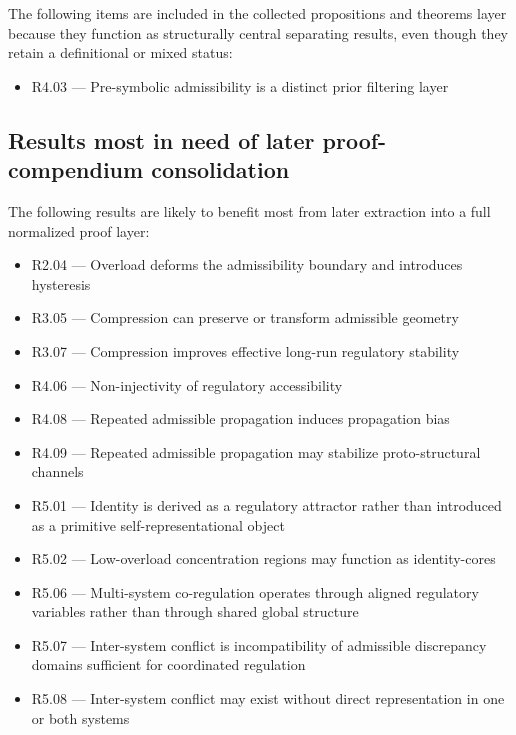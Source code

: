 \documentclass[12pt]{article}
\begin{document}
	The following items are included in the collected propositions and theorems layer because they
	function as structurally central separating results, even though they retain a definitional or
	mixed status:
	
	\begin{itemize}[leftmargin=2em]
		\item R4.03 --- Pre-symbolic admissibility is a distinct prior filtering layer
	\end{itemize}
	
	\subsection{Results most in need of later proof-compendium consolidation}
	
	The following results are likely to benefit most from later extraction into a full normalized
	proof layer:
	
	\begin{itemize}[leftmargin=2em]
		\item R2.04 --- Overload deforms the admissibility boundary and introduces hysteresis
		\item R3.05 --- Compression can preserve or transform admissible geometry
		\item R3.07 --- Compression improves effective long-run regulatory stability
		\item R4.06 --- Non-injectivity of regulatory accessibility
		\item R4.08 --- Repeated admissible propagation induces propagation bias
		\item R4.09 --- Repeated admissible propagation may stabilize proto-structural channels
		\item R5.01 --- Identity is derived as a regulatory attractor rather than introduced as a primitive self-representational object
		\item R5.02 --- Low-overload concentration regions may function as identity-cores
		\item R5.06 --- Multi-system co-regulation operates through aligned regulatory variables rather than through shared global structure
		\item R5.07 --- Inter-system conflict is incompatibility of admissible discrepancy domains sufficient for coordinated regulation
		\item R5.08 --- Inter-system conflict may exist without direct representation in one or both systems
	\end{itemize}
	
\end{document}
